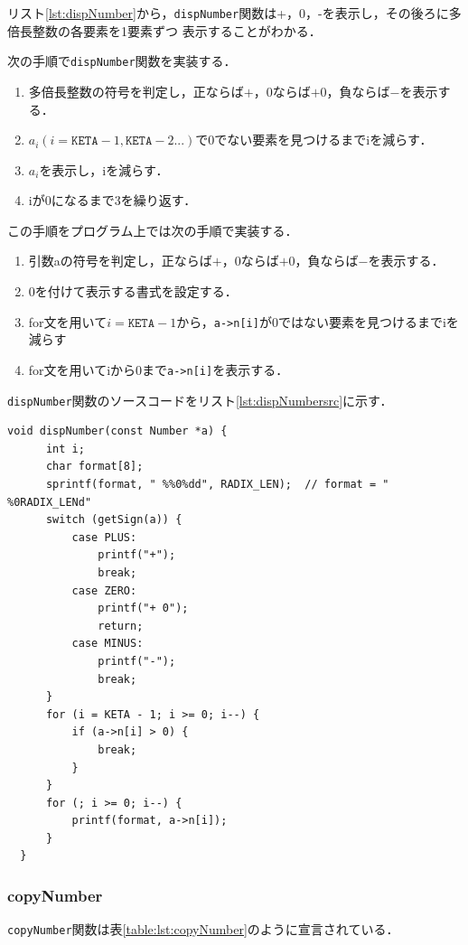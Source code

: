 \documentclass[a4paper,11pt,dvipdfmx]{jsarticle}
\begin{document}
リスト\ref{lst:dispNumber}から，\texttt{dispNumber}関数は+，0，-を表示し，その後ろに多倍長整数の各要素を1要素ずつ
表示することがわかる．

次の手順で\texttt{dispNumber}関数を実装する．
\begin{enumerate}
  \item 多倍長整数の符号を判定し，正ならば$+$，0ならば$+$0，負ならば$-$を表示する．
  \item $a_i(i = \texttt{KETA}-1,\texttt{KETA}-2...)$で0でない要素を見つけるまでiを減らす．
  \item $a_i$を表示し，iを減らす．
  \item iが0になるまで3を繰り返す．
\end{enumerate}

この手順をプログラム上では次の手順で実装する．
\begin{enumerate}
  \item 引数aの符号を判定し，正ならば$+$，0ならば$+$0，負ならば$-$を表示する．
  \item 0を付けて表示する書式を設定する．
  \item for文を用いて$i=\texttt{KETA}-1$から，\texttt{a->n[i]}が0ではない要素を見つけるまでiを減らす
  \item for文を用いてiから0まで\texttt{a->n[i]}を表示する．
\end{enumerate}

\texttt{dispNumber}関数のソースコードをリスト\ref{lst:dispNumbersrc}に示す．

\begin{lstlisting}[caption=\texttt{dispNumber}関数,label=lst:dispNumbersrc]
  void dispNumber(const Number *a) {
      int i;
      char format[8];
      sprintf(format, " %%0%dd", RADIX_LEN);  // format = " %0RADIX_LENd"
      switch (getSign(a)) {
          case PLUS:
              printf("+");
              break;
          case ZERO:
              printf("+ 0");
              return;
          case MINUS:
              printf("-");
              break;
      }
      for (i = KETA - 1; i >= 0; i--) {
          if (a->n[i] > 0) {
              break;
          }
      }
      for (; i >= 0; i--) {
          printf(format, a->n[i]);
      }
  }
\end{lstlisting}

\subsubsection{copyNumber}
\texttt{copyNumber}関数は表\ref{table:lst:copyNumber}のように宣言されている．
\end{document}
